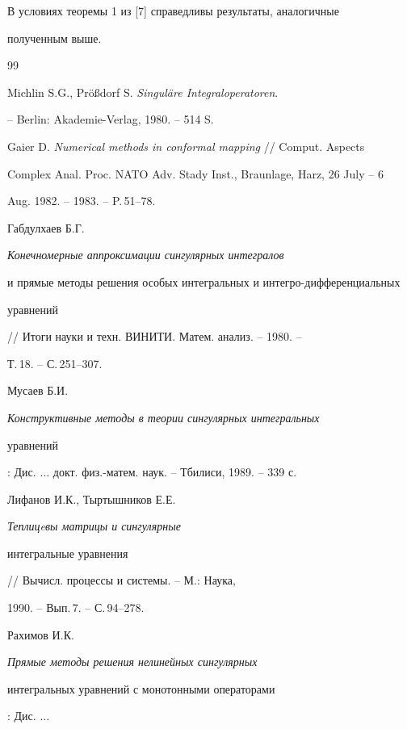 \begin{note}


В условиях теоремы 1 из [7] справедливы результаты, аналогичные 


полученным выше.


\end{note}





\begin{thebibliography}{99}







Michlin S.G., Pr\"o\ss{}dorf S. {\em Singul\"{a}re Integraloperatoren}.


-- Berlin: Akademie-Verlag, 1980. -- 514 S.




Gaier D. {\em Numerical methods in conformal mapping} // Comput. Aspects 


Complex Anal. Proc. NATO Adv. Stady Inst., Braunlage, Harz, 26 July -- 6


Aug. 1982. -- 1983. -- P.\,51--78.




Габдулхаев Б.Г. {\em Конечномерные аппроксимации сингулярных интегралов


и прямые методы решения особых интегральных и интегро-дифференциальных


уравнений} // Итоги науки и техн. ВИНИТИ. Матем. анализ. -- 1980. --


Т.\,18. -- С.\,251--307.




Мусаев Б.И. {\em Конструктивные методы в теории сингулярных интегральных


уравнений}: Дис. $\dotsc$ докт. физ.-матем. наук. -- Тбилиси, 1989. -- 339 с.




Лифанов И.К., Тыртышников Е.Е. {\em Теплицeвы матрицы и сингулярные 


интегральные уравнения} // Вычисл. процессы и системы. -- М.: Наука, 


1990. -- Вып.\,7. -- С.\,94--278.




Рахимов И.К. {\em Прямые методы решения нелинейных сингулярных 


интегральных уравнений с монотонными операторами}: Дис. $\dotsc$



\end{thebibliography}
